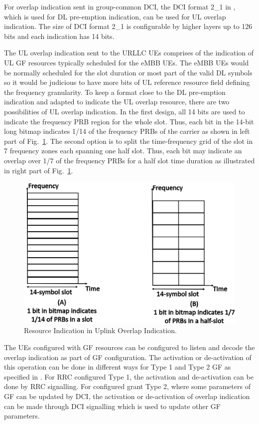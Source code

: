 \documentclass[conference]{IEEEtran}
\begin{document}
For overlap indication sent in group-common DCI, the DCI format 2\_1 in \cite{ad6}, which is used for DL pre-emption indication, can be used for UL overlap indication. The size of DCI format 2\_1 is configurable by higher layers up to 126 bits and each indication has 14 bits. 

The UL overlap indication sent to the URLLC UEs comprises of the indication of UL GF resources typically scheduled for the eMBB UEs. The eMBB UEs would be normally scheduled for the slot duration or most part of the valid DL symbols so it would be judicious to have more bits of UL reference resource field defining the frequency granularity. To keep a format close to the DL pre-emption indication and adapted to indicate the UL overlap resource, there are two possibilities of UL overlap indication. In the first design, all 14 bits are used to indicate the frequency PRB region for the whole slot. Thus, each bit in the 14-bit long bitmap indicates 1/14 of the frequency PRBs of the carrier as shown in left part of Fig.~\ref{fig3}. The second option is to split the time-frequency grid of the slot in 7 frequency zones each spanning one half slot. Thus, each bit may indicate an overlap over 1/7 of the frequency PRBs for a half slot time duration as illustrated in right part of Fig.~\ref{fig3}. 

\begin{figure}[htbp]
\centerline{\includegraphics[scale=0.2]{fig3.png}}
\caption{Resource Indication in Uplink Overlap Indication.}
\label{fig3}
\vspace{-6mm}
\end{figure}

The UEs configured with GF resources can be configured to listen and decode the overlap indication as part of GF configuration. The activation or de-activation of this operation can be done in different ways for Type 1 and Type 2 GF as specified in \cite{ad4}. For RRC configured Type 1, the activation and de-activation can be done by RRC signalling. For configured grant Type 2, where some parameters of GF can be updated by DCI, the activation or de-activation of overlap indication can be made through DCI signalling which is used to update other GF parameters.
\end{document}

